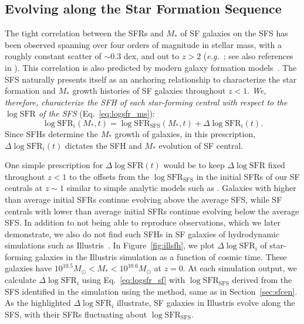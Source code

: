 \documentclass[12pt, letterpaper, preprint, tighten]{aastex62}
\newcommand{\edt}[1]{{\color{dred}{\bf} #1}}
\newcommand{\beq}{\begin{equation}}
\newcommand{\eeq}{\end{equation}}
\newcommand{\logsfr}{\log\mathrm{SFR}}
\newcommand{\logsfrsfs}{\log\mathrm{SFR}_\mathrm{SFS}}
\begin{document}
\subsection{Evolving along the Star Formation Sequence} \label{sec:modelevol}
The tight correlation between the SFRs and $M_*$ of SF galaxies on 
the SFS has been observed spanning over four orders of magnitude
in stellar mass, with a roughly constant scatter of ${\sim}0.3$ dex, and out
to $z > 2$
(\emph{e.g.}~\citealt{noeske2007,daddi2007,elbaz2007,salim2007,santini2009,karim2011,whitaker2012,moustakas2013,lee2015}; see also references in \citealt{speagle2014}).
This correlation is also predicted by modern galaxy formation models~\citep[][see
\citealt{hahn2018a} and references therein]{somerville2015}. The SFS
naturally presents itself as an anchoring relationship to characterize
the star formation and $M_*$ growth histories of SF galaxies throughout $z < 1$. 
\emph{We, therefore, characterize the SFH of each star-forming central
with respect to the $\logsfr$ of the SFS} (Eq.~\ref{eq:logsfr_ms}):
\beq \label{eq:logsfr_sf}
\logsfr_i(M_*, t) = \logsfrsfs(M_*, t) + \Delta\logsfr_i(t).
\eeq
Since SFHs determine the $M_*$ growth of galaxies, in this prescription,
$\Delta \logsfr_i(t)$ dictates the SFH and $M_*$ evolution of SF central.

One simple prescription for $\Delta \logsfr(t)$ would be to keep $\Delta \logsfr$
fixed throughout $z < 1$ to the offsets from the $\logsfrsfs$ in the
initial SFRs of our SF centrals at $z\sim1$ similar to simple analytic
models such as \cite{mitra2015}. Galaxies with higher than average
initial SFRs continue evolving above the average SFS, while SF centrals
with lower than average initial SFRs continue evolving below the average
SFS. In addition to not being able to reproduce observations, which we
later demonstrate, we also do not find such SFHs in SF galaxies of
hydrodynamic simulations such as Illustris~\citep{vogelsberger2014,genel2014}.
In Figure~\ref{fig:illsfh}, we plot $\Delta \logsfr_i$ of star-forming
galaxies in the Illustris simulation as a function of cosmic time. These
galaxies have $10^{10.5}M_\odot < M_* < 10^{10.6}M_\odot$ at $z=0$.
At each simulation output, we calculate $\Delta \logsfr_i$ using Eq.~\ref{eq:logsfr_sf}
with $\logsfrsfs$ derived from the SFS identified
\edt{in the simulation}
using the \cite{hahn2018a} method, same as in Section~\ref{sec:sfcen}. As the
highlighted $\Delta \logsfr_i$ illustrate, SF galaxies in Illustris evolve
along the SFS, with their SFRs fluctuating about $\logsfrsfs$.
\end{document}
